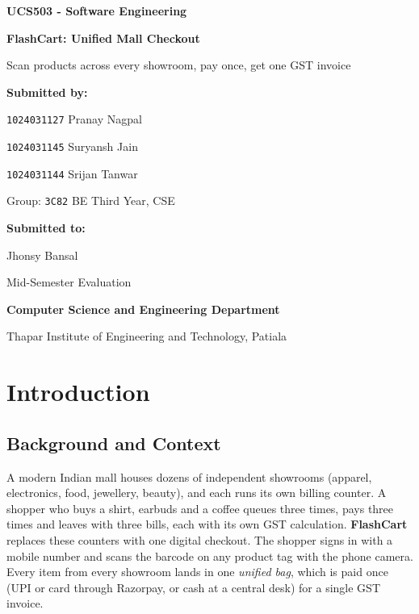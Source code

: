 \documentclass[12pt,letterpaper,twoside,openany]{report}
\newcommand{\coursetitle}{UCS503 - Software Engineering}
\begin{document}
\begin{titlepage}
  \centering
  \vspace*{0.6in}
  {\large\bfseries \coursetitle\par}
  \vspace{0.7in}
  {\LARGE\bfseries FlashCart: Unified Mall Checkout\par}
  \vspace{6pt}
  Scan products across every showroom, pay once, get one GST invoice\par
  \vspace{1.1in}
  {\large\bfseries Submitted by:\par}
  \vspace{8pt}
  {\large
    \texttt{1024031127} Pranay Nagpal\par
    \texttt{1024031145} Suryansh Jain\par
    \texttt{1024031144} Srijan Tanwar\par}
  \vspace{10pt}
  Group: \texttt{3C82} BE Third Year, CSE\par
  \vspace{1.1in}
  {\large\bfseries Submitted to:\par}
  \vspace{6pt}
  Jhonsy Bansal\par
  \vfill
  {\large Mid-Semester Evaluation\par}
  \vspace{4pt}
  {\large\bfseries Computer Science and Engineering Department\par}
  \vspace{4pt}
  Thapar Institute of Engineering and Technology, Patiala\par
\end{titlepage}

\tableofcontents

\chapter{Introduction}

\section{Background and Context}
A modern Indian mall houses dozens of independent showrooms (apparel, electronics, food,
jewellery, beauty), and each runs its own billing counter. A shopper who buys a shirt,
earbuds and a coffee queues three times, pays three times and leaves with three bills, each
with its own GST calculation. \textbf{FlashCart} replaces these counters with one digital
checkout. The shopper signs in with a mobile number and scans the barcode on any product tag
with the phone camera. Every item from every showroom lands in one \emph{unified bag}, which
is paid once (UPI or card through Razorpay, or cash at a central desk) for a single GST
invoice.
\end{document}
